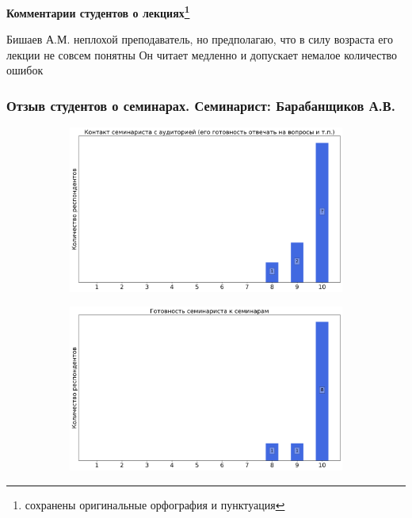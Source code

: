 		\textbf{Комментарии студентов о лекциях\protect\footnote{сохранены оригинальные орфография и пунктуация}}
            \begin{commentbox} 
                Бишаев А.М. неплохой преподаватель, но предполагаю, что в силу возраста его лекции не совсем понятны
                Он читает медленно и допускает немалое количество ошибок 
            \end{commentbox} 
    
    
    \subsubsection{Отзыв студентов о семинарах. Семинарист: Барабанщиков А.В.}
		\begin{figure}[H]
			\centering
			\begin{subfigure}[b]{0.45\textwidth}
				\centering
				\includegraphics[width=\textwidth]{images/2 course/Дифференциальные уравнения/seminarists-marks-Барабанщиков А.В.-0.png}
			\end{subfigure}
			\begin{subfigure}[b]{0.45\textwidth}
				\centering
				\includegraphics[width=\textwidth]{images/2 course/Дифференциальные уравнения/seminarists-marks-Барабанщиков А.В.-1.png}

\end{subfigure}
\end{figure}
